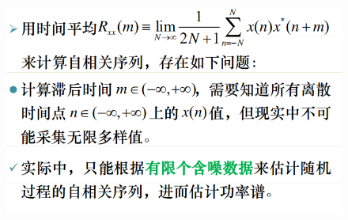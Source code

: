 \documentclass[UTF8]{ctexart} %
\begin{document}
				\begin{figure}[H]
					\centering\includegraphics[scale=0.4]{69.png}
				\end{figure}
\end{document}
